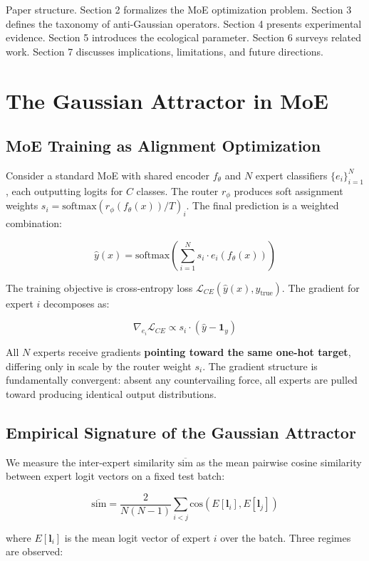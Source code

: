 \documentclass[twoside]{article}
\theoremstyle{definition}
\begin{document}
Paper structure. Section 2 formalizes the MoE optimization problem. Section 3 defines the taxonomy of anti-Gaussian operators. Section 4 presents experimental evidence. Section 5 introduces the ecological parameter. Section 6 surveys related work. Section 7 discusses implications, limitations, and future directions.

\section{The Gaussian Attractor in MoE}

\subsection{MoE Training as Alignment Optimization}

Consider a standard MoE with shared encoder $f_\theta$ and $N$ expert classifiers $\{e_i\}_{i=1}^{N}$, each outputting logits for $C$ classes. The router $r_\phi$ produces soft assignment weights $s_i = \text{softmax}(r_\phi(f_\theta(x)) / T)_i$. The final prediction is a weighted combination:

$$\hat{y}(x) = \text{softmax}\left(\sum_{i=1}^N s_i \cdot e_i(f_\theta(x))\right)$$

The training objective is cross-entropy loss $\mathcal{L}_{CE}(\hat{y}(x), y_{\text{true}})$. The gradient for expert $i$ decomposes as:

$$\nabla_{e_i} \mathcal{L}_{CE} \propto s_i \cdot (\hat{y} - \mathbf{1}_y)$$

All $N$ experts receive gradients \textbf{pointing toward the same one-hot target}, differing only in scale by the router weight $s_i$. The gradient structure is fundamentally convergent: absent any countervailing force, all experts are pulled toward producing identical output distributions.

\subsection{Empirical Signature of the Gaussian Attractor}

We measure the inter-expert similarity $\overline{\text{sim}}$ as the mean pairwise cosine similarity between expert logit vectors on a fixed test batch:

$$\overline{\text{sim}} = \frac{2}{N(N-1)} \sum_{i<j} \text{cos}(E[\mathbf{l}_i], E[\mathbf{l}_j])$$

where $E[\mathbf{l}_i]$ is the mean logit vector of expert $i$ over the batch. Three regimes are observed:
\end{document}
